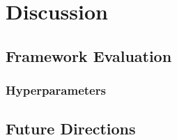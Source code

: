 \section{Discussion} \label{chapter:discussion}
\subsection{Framework Evaluation}
\subsubsection*{Hyperparameters}

\subsection{Future Directions}